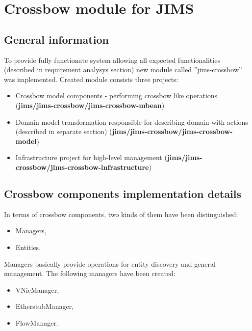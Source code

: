 \documentclass[11pt]{book}
\begin{document}
	  \section{Crossbow module for JIMS}
		\label{sec:impl:module}
	
		\subsection{General information}
			\label{sec:impl:general}
		
			To provide fully functionate system allowing all expected functionalities (described in requirement analysys section)
			new module called ''jims-crossbow'' was implemented. Created module consists three projects:
			\begin{itemize}
				\item{Crossbow model components - performing crossbow like operations (\textbf{jims/jims-crossbow/jims-crossbow-mbean})}
				\item{Domain model transformation responsible for describing domain with actions 
					(described in separate section) (\textbf{jims/jims-crossbow/jims-crossbow-model})}
				\item{Infrastructure project for high-level management (\textbf{jims/jims-crossbow/jims-crossbow-infrastructure})}
			\end{itemize}
		
		\subsection{Crossbow components implementation details}
			\label{sec:impl:comp}
	
		In terms of crossbow components, two kinds of them have been distinguished:

		\begin{itemize}
			\item Managers,
			\item Entities.
		\end{itemize}

		Managers basically provide operations for entity discovery and general management. The following managers have
		been created:

		\begin{itemize}
			\item VNicManager,
			\item EtherstubManager,
			\item FlowManager.
		\end{itemize}
\end{document}

